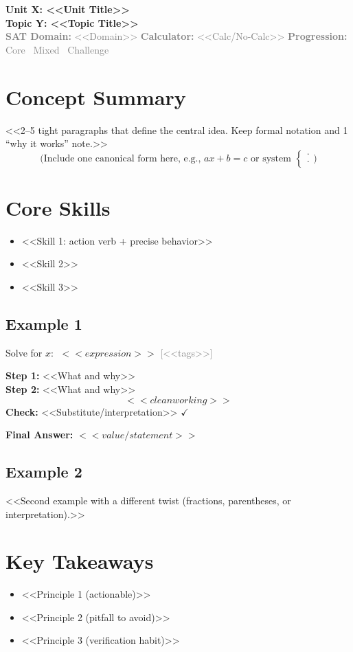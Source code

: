 \documentclass[12pt]{article}
\newcommand{\UnitTitle}{Unit X: <<Unit Title>>}
\newcommand{\TopicTitle}{Topic Y: <<Topic Title>>}
\newcommand{\TopicMeta}[3]{%
  \textcolor{gray}{\footnotesize \textbf{SAT Domain:} #1 \quad \textbf{Calculator:} #2 \quad \textbf{Progression:} #3}
}
\newcommand{\qtag}[1]{\textcolor{gray}{\footnotesize [#1]}}
\newenvironment{Example}[1]{%
  \subsection*{Example #1}%
}{\vspace{0.25em}}
\begin{document}
\begin{center}
  \LARGE \textbf{\UnitTitle}\\[6pt]
  \Large \textbf{\TopicTitle}\\[4pt]
  \TopicMeta{<<Domain>>}{<<Calc/No-Calc>>}{Core \textrightarrow\ Mixed \textrightarrow\ Challenge}
\end{center}

\vspace{0.75em}

\section*{Concept Summary}
<<2–5 tight paragraphs that define the central idea. Keep formal notation and 1 “why it works” note.>>
\[
\text{(Include one canonical form here, e.g., } ax+b=c \text{ or system } \begin{cases} \cdot \\ \cdot \end{cases})
\]

\section*{Core Skills}
\begin{itemize}
  \item <<Skill 1: action verb + precise behavior>>
  \item <<Skill 2>>
  \item <<Skill 3>>
\end{itemize}

\begin{Example}{1}
Solve for \(x\): \(\;<<expression>>\) \qtag{<<tags>>}

\textbf{Step 1:} <<What and why>> \\
\textbf{Step 2:} <<What and why>>
\[
<<clean working>>
\]
\textbf{Check:} <<Substitute/interpretation>> \quad \(\checkmark\)

\textbf{Final Answer:} \(\boxed{<<value/statement>>}\)
\end{Example}

\begin{Example}{2}
<<Second example with a different twist (fractions, parentheses, or interpretation).>>
\end{Example}

\section*{Key Takeaways}
\begin{itemize}
  \item <<Principle 1 (actionable)>>
  \item <<Principle 2 (pitfall to avoid)>>
  \item <<Principle 3 (verification habit)>>
\end{itemize}
\end{document}
